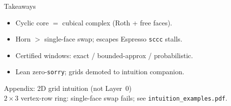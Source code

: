 \documentclass[aspectratio=169,11pt]{beamer}
\begin{document}
\begin{frame}{Takeaways}
\begin{itemize}
\item Cyclic core $=$ cubical complex (Roth + free faces).
\item Horn $>$ single-face swap; escapes Espresso \texttt{sccc} stalls.
\item Certified windows: exact / bounded-approx / probabilistic.
\item Lean zero-\texttt{sorry}; grids demoted to intuition companion.
\end{itemize}
\end{frame}

\begin{frame}{Appendix: 2D grid intuition (not Layer~0)}
\centering
\\[0.6em]
{\small $2\times 3$ vertex-row ring: single-face swap fails; see
\texttt{intuition\_examples.pdf}.}
\end{frame}
\end{document}

